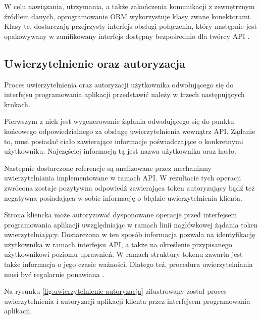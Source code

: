 W celu nawiązania, utrzymania, a także zakończenia komunikacji z zewnętrznym źródłem danych, oprogramowanie ORM wykorzystuje klasy zwane konektorami. Klasy te, dostarczają przejrzysty interfejs obsługi połączenia, który następnie jest opakowywany w zunifikowany interfejs dostępny bezpośrednio dla twórcy API \cite{TORRES20171}.

\subsection*{Uwierzytelnienie oraz autoryzacja}
Proces uwierzytelnienia oraz autoryzacji użytkownika odwołującego się do interfejsu programowania aplikacji przedstawić należy w trzech następujących krokach.

Pierwszym z nich jest wygenerowanie żądania odwołującego się do punktu końcowego odpowiedzialnego za obsługę uwierzytelnienia wewnątrz API. Żądanie to, musi posiadać ciało zawierające informacje poświadczające o konkretnymi użytkowniku. Najczęściej informacją tą jest nazwa użytkownika oraz hasło.

Następnie dostarczone referencje są analizowane przez mechanizmy uwierzytelniania implementowane w ramach API. W rezultacie tych operacji zwrócona zostaje pozytywna odpowiedź zawierająca token autoryzujący bądź też negatywna posiadająca w sobie informację o błędzie uwierzytelnienia klienta.

Strona kliencka może autoryzować dysponowane operacje przed interfejsem programowania aplikacji uwzględniając w ramach linii nagłówkowej żądania token uwierzytelniający. Dostarczona w ten sposób informacja pozwala na identyfikację użytkownika w ramach interfejsu API, a także na określenie przypisanego użytkownikowi poziomu uprawnień. W ramach struktury tokenu zawarta jest także informacja o jego czasie ważności. Dlatego też, procedura uwierzytelniania musi być regularnie ponawiana \cite{lakshmiraghavan2013pro}.

Na rysunku \ref{fig:uwierzytelnienie-autoryzacja} zilustrowany został proces uwierzytelnienia i autoryzacji aplikacji klienta przez interfejsem programowania aplikacji. 

